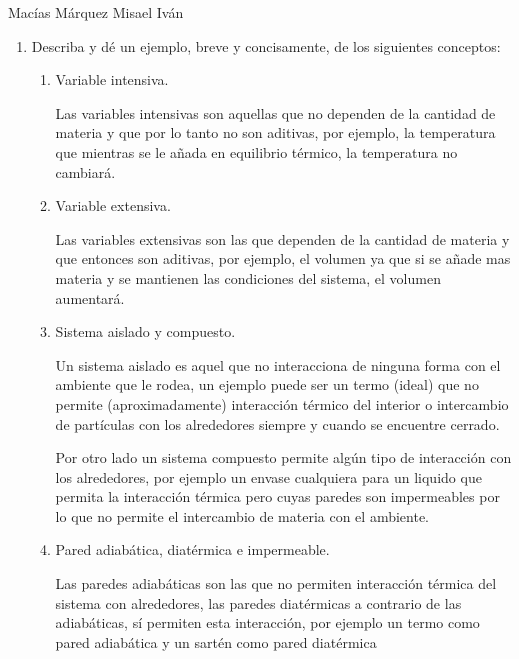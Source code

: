 \documentclass[12pt,a4paper]{article}
\begin{document}
Macías Márquez Misael Iván

\begin{enumerate}






    \item Describa y dé un ejemplo, breve y concisamente, de los siguientes conceptos:
    
    \begin{enumerate}
        \item Variable intensiva.
        
        Las variables intensivas son aquellas que no dependen de la cantidad de materia y que por lo tanto no son aditivas, por ejemplo, la temperatura que mientras se le añada en equilibrio térmico, la temperatura no cambiará.
        
        \item Variable extensiva.
        
        Las variables extensivas son las que dependen de la cantidad de materia y que entonces son aditivas, por ejemplo, el volumen ya que si se añade mas materia y se mantienen las condiciones del sistema, el volumen aumentará.
        
        \item Sistema aislado y compuesto.
        
        Un sistema aislado es aquel que no interacciona de ninguna forma con el ambiente que le rodea, un ejemplo puede ser un termo (ideal) que no permite (aproximadamente) interacción térmico del interior o intercambio de partículas con los alrededores siempre y cuando se encuentre cerrado.
        
        Por otro lado un sistema compuesto permite algún tipo de interacción con los alrededores, por ejemplo un envase cualquiera para un liquido que permita la interacción térmica  pero cuyas paredes son impermeables por lo que no permite el intercambio de materia con el ambiente.
        
        \item Pared adiabática, diatérmica e impermeable.
        
        Las paredes adiabáticas son las que no permiten interacción térmica del sistema con alrededores, las paredes diatérmicas a contrario de las adiabáticas, sí permiten esta interacción, por ejemplo un termo como pared adiabática y un sartén como pared diatérmica
        

\end{enumerate}
\end{enumerate}
\end{document}
